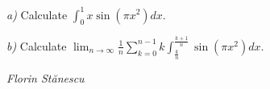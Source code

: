 \textit{a)} Calculate $ \int_{0}^1 x\sin\left( \pi x^2\right) dx. $

\textit{b)} Calculate $ \lim_{n\to\infty} \frac{1}{n}\sum_{k=0}^{n-1} k\int_{\frac{k}{n}}^{\frac{k+1}{n}} \sin\left(\pi x^2\right) dx. $

\textit{Florin Stănescu}